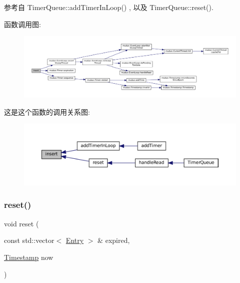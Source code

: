 参考自 Timer\+Queue\+::add\+Timer\+In\+Loop() , 以及 Timer\+Queue\+::reset().

函数调用图\+:
\nopagebreak
\begin{figure}[H]
\begin{center}
\leavevmode
\includegraphics[width=350pt]{classmuduo_1_1TimerQueue_ac4bdfea344ee2a30857d2eabadfef399_cgraph}
\end{center}
\end{figure}
这是这个函数的调用关系图\+:
\nopagebreak
\begin{figure}[H]
\begin{center}
\leavevmode
\includegraphics[width=350pt]{classmuduo_1_1TimerQueue_ac4bdfea344ee2a30857d2eabadfef399_icgraph}
\end{center}
\end{figure}
\mbox{\label{classmuduo_1_1TimerQueue_ac59fd8ddc045aae320982a0913993237}} 
\subsubsection{\texorpdfstring{reset()}{reset()}}
{\footnotesize\ttfamily void reset (\begin{DoxyParamCaption}\item[{const std\+::vector$<$ \hyperlink{classmuduo_1_1TimerQueue_aa2bab77baf38279fd11dcfcbf8fb15d8}{Entry} $>$ \&}]{expired,  }\item[{\hyperlink{classmuduo_1_1Timestamp}{Timestamp}}]{now }\end{DoxyParamCaption})\hspace{0.3cm}{\ttfamily [private]}}



